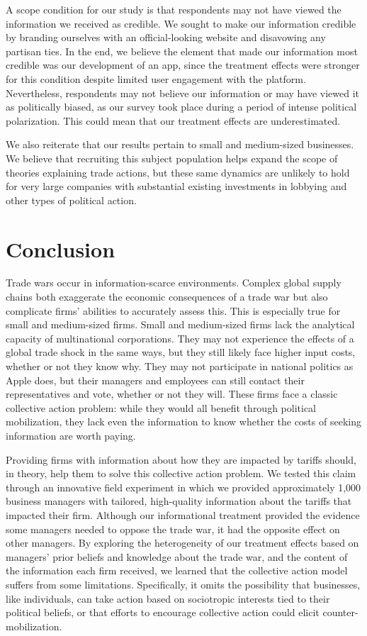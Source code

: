 \documentclass{article}
\begin{document}
A scope condition for our study is that respondents may not have viewed the information we received as credible. We sought to make our information credible by branding ourselves with an official-looking website and disavowing any partisan ties. In the end, we believe the element that made our information most credible was our development of an app, since the treatment effects were stronger for this condition despite limited user engagement with the platform. Nevertheless, respondents may not believe our information or may have viewed it as politically biased, as our survey took place during a period of intense political polarization. This could mean that our treatment effects are underestimated.

We also reiterate that our results pertain to small and medium-sized businesses. We believe that recruiting this subject population helps expand the scope of theories explaining trade actions, but these same dynamics are unlikely to hold for very large companies with substantial existing investments in lobbying and other types of political action.

\section{Conclusion}

Trade wars occur in information-scarce environments. Complex global supply chains both exaggerate the economic consequences of a trade war but also complicate firms' abilities to accurately assess this. This is especially true for small and medium-sized firms. Small and medium-sized firms lack the analytical capacity of multinational corporations. They may not experience the effects of a global trade shock in the same ways, but they still likely face higher input costs, whether or not they know why. They may not participate in national politics as Apple does, but their managers and employees can still contact their representatives and vote, whether or not they will. These firms face a classic collective action problem: while they would all benefit through political mobilization, they lack even the information to know whether the costs of seeking information are worth paying.

Providing firms with information about how they are impacted by tariffs should, in theory, help them to solve this collective action problem. We tested this claim through an innovative field experiment in which we provided approximately 1,000 business managers with tailored, high-quality information about the tariffs that impacted their firm. Although our informational treatment provided the evidence some managers needed to oppose the trade war, it had the opposite effect on other managers. By exploring the heterogeneity of our treatment effects based on managers' prior beliefs and knowledge about the trade war, and the content of the information each firm received, we learned that the collective action model suffers from some limitations. Specifically, it omits the possibility that businesses, like individuals, can take action based on sociotropic interests tied to their political beliefs, or that efforts to encourage collective action could elicit counter-mobilization.
\end{document}
